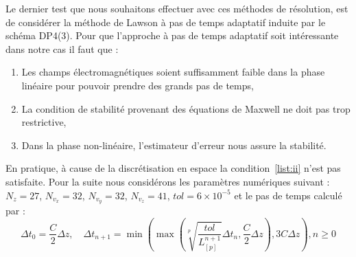 Le dernier test que nous souhaitons effectuer avec ces méthodes de résolution, est de considérer la méthode de Lawson à pas de temps adaptatif induite par le schéma DP4(3). Pour que l'approche à pas de temps adaptatif soit intéressante dans notre cas il faut que :
\begin{enumerate}[label=(\roman*)]
  \item Les champs électromagnétiques soient suffisamment faible dans la phase linéaire pour pouvoir prendre des grands pas de temps,\label{list:i}
  \item La condition de stabilité provenant des équations de Maxwell ne doit pas trop restrictive,\label{list:ii}
  \item Dans la phase non-linéaire, l'estimateur d'erreur nous assure la stabilité.\label{list:iii}
\end{enumerate}
En pratique, à cause de la discrétisation en espace la condition~\ref{list:ii} n'est pas satisfaite. Pour la suite nous considérons les paramètres numériques suivant : $N_z=27$, $N_{v_x}=32$, $N_{v_y}=32$, $N_{v_z}=41$, $tol=6\times10^{-5}$ et le pas de temps calculé par :
$$
  \Delta t_0 = \frac{C}{2}\Delta z,\quad \Delta t_{n+1} = \min\left( \max\left( \sqrt[p]{\frac{tol}{L_{[p]}^{n+1}}}\Delta t_n ,\frac{C}{2}\Delta z \right) , 3C\Delta z \right), n\geq 0
$$
